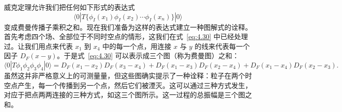 威克定理允许我们把任何如下形式的表达式
\begin{equation}
  \langle 0|T\{\phi_I(x_1)\phi_I(x_2)\cdots\phi_I(x_n)\}|0\rangle
\end{equation}
变成费曼传播子乘积之和。现在我们准备为这样的表达式建立一种图解式的诠释。首先考虑四个场、全部位于不同时空点的情形，这我们在式~\eqref{eq:4.30} 中已经处理过。让我们用点来代表 $x_1$ 到 $x_4$ 中的每一个点，用连接 $x$ 与 $y$ 的线来代表每一个因子 $D_F(x-y)$。于是式~\eqref{eq:4.30} 可以表示成三个图（称为费曼图）之和：
\begin{equation}
  \langle 0|T\phi_1\phi_2\phi_3\phi_4|0\rangle = D_F(x_1-x_2)D_F(x_3-x_4)
    + D_F(x_1-x_3)D_F(x_2-x_4)
    + D_F(x_1-x_4)D_F(x_2-x_3) .
  \label{eq:4.42}
\end{equation}
虽然这并非严格意义上的可测量量，但这些图确实提示了一种诠释：粒子在两个时空点产生，每一个传播到另一个点，然后它们被湮灭。这可以通过三种方式发生，对应于把点两两连接的三种方式，如这三个图所示。这一过程的总振幅是三个图之和。

